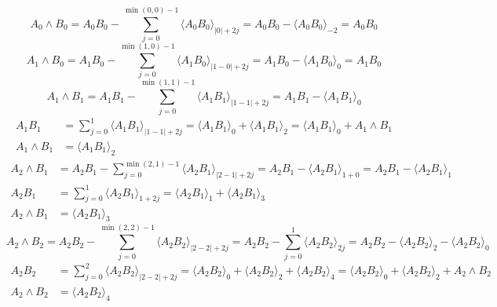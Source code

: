 \documentclass[aps, preprint]{revtex4}
\begin{document}
\begin{equation}A_{0} \wedge B_{0} =A_{0} B_{0} -\sum _{j =0}^{\min \left (0 ,0\right ) -1} \langle A_{0} B_{0} \rangle _{\left \vert 0\right \vert  +2 j} =A_{0} B_{0} - \langle A_{0} B_{0} \rangle _{ -2} =A_{0} B_{0}
\end{equation}
\begin{equation}A_{1} \wedge B_{0} =A_{1} B_{0} -\sum _{j =0}^{\min \left (1 ,0\right ) -1} \langle A_{1} B_{0} \rangle _{\left \vert 1 -0\right \vert  +2 j} =A_{1} B_{0} - \langle A_{1} B_{0} \rangle _{0} =A_{1} B_{0}
\end{equation}
\begin{equation}A_{1} \wedge B_{1} =A_{1} B_{1} -\sum _{j =0}^{\min \left (1 ,1\right ) -1} \langle A_{1} B_{1} \rangle _{\left \vert 1 -1\right \vert  +2 j} =A_{1} B_{1} - \langle A_{1} B_{1} \rangle _{0}
\end{equation}
\begin{align*}A_{1} B_{1} &  =\sum _{j =0}^{1} \langle A_{1} B_{1} \rangle _{\left \vert 1 -1\right \vert  +2 j} = \langle A_{1} B_{1} \rangle _{0} + \langle A_{1} B_{1} \rangle _{2} = \langle A_{1} B_{1} \rangle _{0} +A_{1} \wedge B_{1} \\
A_{1} \wedge B_{1} &  = \langle A_{1} B_{1} \rangle _{2}\end{align*}
\begin{align}A_{2} \wedge B_{1} &  =A_{2} B_{1} -\sum _{j =0}^{\min \left (2 ,1\right ) -1} \langle A_{2} B_{1} \rangle _{\left \vert 2 -1\right \vert  +2 j} =A_{2} B_{1} - \langle A_{2} B_{1} \rangle _{1 +0} =A_{2} B_{1} - \langle A_{2} B_{1} \rangle _{1} \\
A_{2} B_{1} &  =\sum _{j =0}^{1} \langle A_{2} B_{1} \rangle _{1 +2 j} = \langle A_{2} B_{1} \rangle _{1} + \langle A_{2} B_{1} \rangle _{3} \\
A_{2} \wedge B_{1} &  = \langle A_{2} B_{1} \rangle _{3}\end{align}
\begin{equation}A_{2} \wedge B_{2} =A_{2} B_{2} -\sum _{j =0}^{\min \left (2 ,2\right ) -1} \langle A_{2} B_{2} \rangle _{\left \vert 2 -2\right \vert  +2 j} =A_{2} B_{2} -\sum _{j =0}^{1} \langle A_{2} B_{2} \rangle _{2 j} =A_{2} B_{2} - \langle A_{2} B_{2} \rangle _{2} - \langle A_{2} B_{2} \rangle _{0}
\end{equation}
\begin{align}A_{2} B_{2} &  =\sum _{j =0}^{2} \langle A_{2} B_{2} \rangle _{\left \vert 2 -2\right \vert  +2 j} = \langle A_{2} B_{2} \rangle _{0} + \langle A_{2} B_{2} \rangle _{2} + \langle A_{2} B_{2} \rangle _{4} = \langle A_{2} B_{2} \rangle _{0} + \langle A_{2} B_{2} \rangle _{2} +A_{2} \wedge B_{2} \\
A_{2} \wedge B_{2} &  = \langle A_{2} B_{2} \rangle _{4}\end{align}
\end{document}
